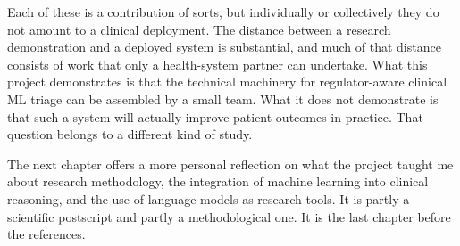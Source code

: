 Each of these is a contribution of sorts, but individually or collectively they do not amount to a clinical deployment. The distance between a research demonstration and a deployed system is substantial, and much of that distance consists of work that only a health-system partner can undertake. What this project demonstrates is that the technical machinery for regulator-aware clinical ML triage can be assembled by a small team. What it does not demonstrate is that such a system will actually improve patient outcomes in practice. That question belongs to a different kind of study.

The next chapter offers a more personal reflection on what the project taught me about research methodology, the integration of machine learning into clinical reasoning, and the use of language models as research tools. It is partly a scientific postscript and partly a methodological one. It is the last chapter before the references.
